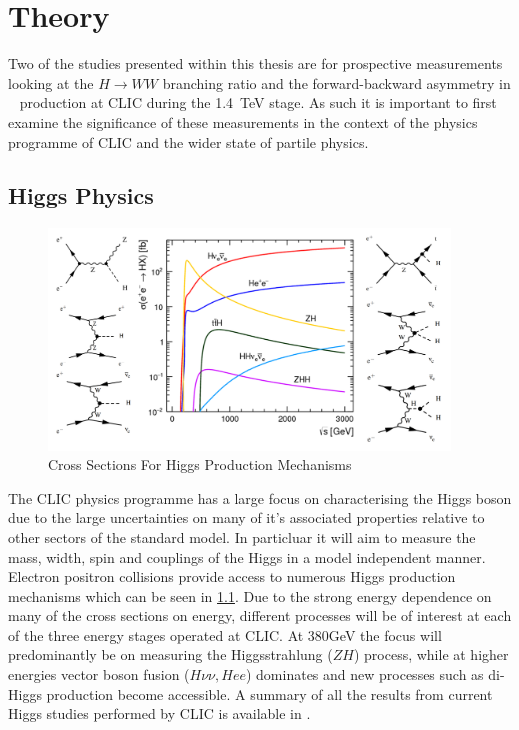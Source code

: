 \chapter{Theory}

Two of the studies presented within this thesis are for prospective measurements looking at the $H\rightarrow WW$ branching ratio and the forward-backward asymmetry in \ttbar~ production at CLIC during the 1.4~TeV stage. As such it is important to first examine the significance of these measurements in the context of the physics programme of CLIC and the wider state of partile physics.


\section{Higgs Physics}

\begin{figure}
  \centering
  \includegraphics[width=0.95\textwidth,keepaspectratio]{Theory/fig/HiggsProcessesExtra.png}
  \caption[Cross Sections For Higgs Production Mechanisms]{Cross Sections For Higgs Production Mechanisms}
  \label{fig:higgsXSecs}
\end{figure}

The CLIC physics programme has a large focus on characterising the Higgs boson due to the large uncertainties on many of it's associated properties relative to other sectors of the standard model. In particluar it will aim to measure the mass, width, spin and couplings of the Higgs in a model independent manner. Electron positron collisions provide access to numerous Higgs production mechanisms which can be seen in \ref{fig:higgsXSecs}. Due to the strong energy dependence on many of the cross sections on energy, different processes will be of interest at each of the three energy stages operated at CLIC. At 380GeV the focus will predominantly be on measuring the Higgsstrahlung ($ZH$) process, while at higher energies vector boson fusion ($H\nu\nu,Hee$) dominates and new processes such as di-Higgs production become accessible. A summary of all the results from current Higgs studies performed by CLIC is available in \cite{Abramowicz:2016zbo}.

